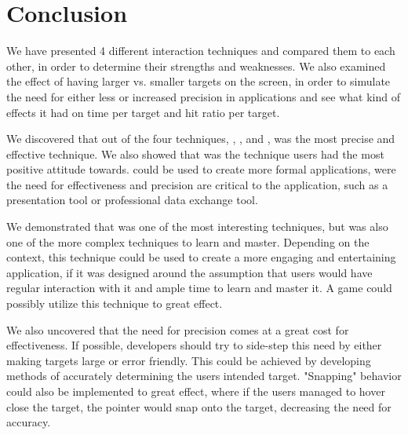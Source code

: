 \section{Conclusion}
We have presented 4 different interaction techniques and compared them to each other, in order to determine their strengths and weaknesses.
We also examined the effect of having larger vs. smaller targets on the screen, in order to simulate the need for either less or increased precision in applications and see what kind of effects it had on time per target and hit ratio per target. 

We discovered that out of the four techniques, \swipe, \throw, \tilt and \pinch, \swipe was the most precise and effective technique. We also showed that \swipe was the technique users had the most positive attitude towards. 
\swipe could be used to create more formal applications, were the need for effectiveness and precision are critical to the application, such as a presentation tool or professional data exchange tool. 

We demonstrated that \pinch was one of the most interesting techniques, but was also one of the more complex techniques to learn and master. 
Depending on the context, this technique could be used to create a more engaging and entertaining application, if it was designed around the assumption that users would have regular interaction with it and ample time to learn and master it.
A game could possibly utilize this technique to great effect. 

We also uncovered that the need for precision comes at a great cost for  effectiveness. 
If possible, developers should try to side-step this need by either making targets large or error friendly.
This could be achieved by developing methods of accurately determining the users intended target.
"Snapping" behavior could also be implemented to great effect, where if the users managed to hover close the target, the pointer would snap onto the target, decreasing the need for accuracy. 